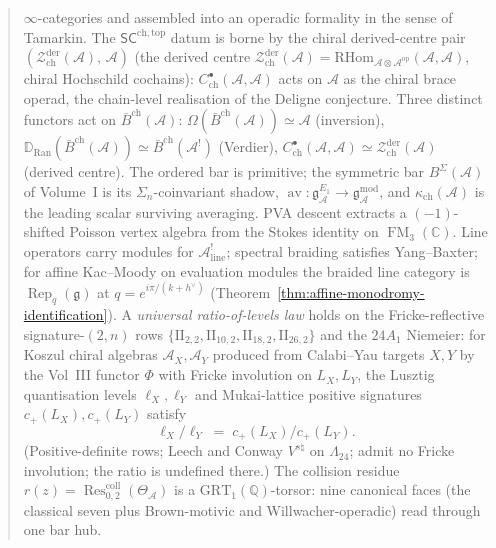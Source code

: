 \documentclass[11pt]{memoir}
\DeclareMathOperator{\FM}{FM}
\DeclareMathOperator{\Res}{Res}
\newcommand{\barBch}{\bar{B}^{\mathrm{ch}}}
\newcommand{\cA}{\mathcal{A}}
\newcommand{\C}{\mathbb{C}}
\newcommand{\Q}{\mathbb{Q}}
\providecommand{\cZ}{\mathcal{Z}}
\providecommand{\fg}{\mathfrak{g}}
\newcommand{\SCchtop}{{\mathsf{SC}^{\mathrm{ch,top}}}}
\begin{document}
\begin{abstract}
$\infty$-categories and assembled into an operadic formality in the
sense of Tamarkin. The $\SCchtop$ datum is borne by the chiral derived-centre pair
$(\cZ^{\mathrm{der}}_{\mathrm{ch}}(\cA),\,\cA)$
(the derived centre $\cZ^{\mathrm{der}}_{\mathrm{ch}}(\cA) =
\mathrm{RHom}_{\cA\otimes\cA^{\mathrm{op}}}(\cA,\cA)$, chiral Hochschild cochains):
$C^\bullet_{\mathrm{ch}}(\cA,\cA)$ acts on $\cA$ as the chiral
brace operad, the chain-level realisation of the Deligne conjecture. Three distinct
functors act on $\barBch(\cA)$:
$\Omega(\barBch(\cA)) \simeq \cA$ (inversion),
$\mathbb{D}_{\mathrm{Ran}}(\barBch(\cA)) \simeq \barBch(\cA^!)$
(Verdier),
$C^\bullet_{\mathrm{ch}}(\cA,\cA) \simeq
\cZ^{\mathrm{der}}_{\mathrm{ch}}(\cA)$ (derived centre).
The ordered bar is primitive; the symmetric bar
$B^\Sigma(\cA)$ of Volume~I is its
$\Sigma_n$-coinvariant shadow,
$\operatorname{av}\colon \mathfrak{g}^{E_1}_\cA \to
\mathfrak{g}^{\mathrm{mod}}_\cA$, and
$\kappa_{\mathrm{ch}}(\cA)$ is the leading scalar surviving
averaging. PVA descent extracts a $(-1)$-shifted Poisson vertex
algebra from the Stokes identity on $\FM_3(\C)$. Line operators
carry modules for $\cA^!_{\mathrm{line}}$; spectral braiding
satisfies Yang--Baxter; for affine Kac--Moody on evaluation
modules the braided line category is $\operatorname{Rep}_q(\fg)$
at $q = e^{i\pi/(k+h^\vee)}$
(Theorem~\ref{thm:affine-monodromy-identification}).
A \emph{universal ratio-of-levels law} holds on the
Fricke-reflective signature-$(2,n)$ rows
$\{\mathrm{II}_{2,2}, \mathrm{II}_{10,2}, \mathrm{II}_{18,2},
\mathrm{II}_{26,2}\}$ and the $24A_1$ Niemeier:
for Koszul chiral algebras $\cA_X, \cA_Y$ produced from
Calabi--Yau targets $X, Y$ by the Vol~III functor $\Phi$
with Fricke involution on $L_X, L_Y$,
the Lusztig quantisation levels $\ell_X, \ell_Y$ and
Mukai-lattice positive signatures $c_+(L_X), c_+(L_Y)$ satisfy
\[
 \ell_X/\ell_Y \;=\; c_+(L_X)/c_+(L_Y).
\]
(Positive-definite rows; Leech and Conway $V^{s\natural}$
on $\Lambda_{24}$; admit no Fricke involution; the ratio
is undefined there.)
The collision residue $r(z) = \Res^{\mathrm{coll}}_{0,2}(\Theta_\cA)$
is a $\mathrm{GRT}_1(\Q)$-torsor: nine canonical faces (the
classical seven plus Brown-motivic and Willwacher-operadic) read
through one bar hub.


\end{abstract}
\end{document}
